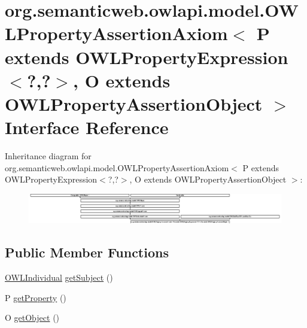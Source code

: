 \hypertarget{interfaceorg_1_1semanticweb_1_1owlapi_1_1model_1_1_o_w_l_property_assertion_axiom_3_01_p_01extenfb1174ccf37bb5b6f03e62cba90873cf}{\section{org.\-semanticweb.\-owlapi.\-model.\-O\-W\-L\-Property\-Assertion\-Axiom$<$ P extends O\-W\-L\-Property\-Expression$<$?,?$>$, O extends O\-W\-L\-Property\-Assertion\-Object $>$ Interface Reference}
\label{interfaceorg_1_1semanticweb_1_1owlapi_1_1model_1_1_o_w_l_property_assertion_axiom_3_01_p_01extenfb1174ccf37bb5b6f03e62cba90873cf}
}
Inheritance diagram for org.\-semanticweb.\-owlapi.\-model.\-O\-W\-L\-Property\-Assertion\-Axiom$<$ P extends O\-W\-L\-Property\-Expression$<$?,?$>$, O extends O\-W\-L\-Property\-Assertion\-Object $>$\-:\begin{figure}[H]
\begin{center}
\leavevmode
\includegraphics[height=1.309942cm]{interfaceorg_1_1semanticweb_1_1owlapi_1_1model_1_1_o_w_l_property_assertion_axiom_3_01_p_01extenfb1174ccf37bb5b6f03e62cba90873cf}
\end{center}
\end{figure}
\subsection*{Public Member Functions}
\begin{DoxyCompactItemize}
\item 
\hyperlink{interfaceorg_1_1semanticweb_1_1owlapi_1_1model_1_1_o_w_l_individual}{O\-W\-L\-Individual} \hyperlink{interfaceorg_1_1semanticweb_1_1owlapi_1_1model_1_1_o_w_l_property_assertion_axiom_3_01_p_01extenfb1174ccf37bb5b6f03e62cba90873cf_ab9e2c5746692263369231d8b5929dc7b}{get\-Subject} ()
\item 
P \hyperlink{interfaceorg_1_1semanticweb_1_1owlapi_1_1model_1_1_o_w_l_property_assertion_axiom_3_01_p_01extenfb1174ccf37bb5b6f03e62cba90873cf_a709cb98c94605d1d88db998d1a162291}{get\-Property} ()
\item 
O \hyperlink{interfaceorg_1_1semanticweb_1_1owlapi_1_1model_1_1_o_w_l_property_assertion_axiom_3_01_p_01extenfb1174ccf37bb5b6f03e62cba90873cf_a92f82f1ce2f26b4b0c3ceda945ea0054}{get\-Object} ()
\end{DoxyCompactItemize}


